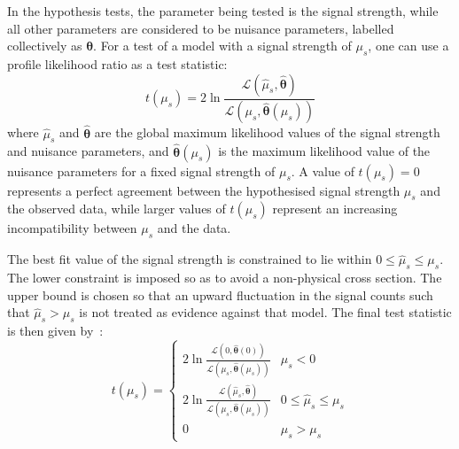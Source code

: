 In the hypothesis tests, the parameter being tested is the signal strength, 
while all other parameters are considered to be nuisance parameters, labelled 
collectively as $\bm{\theta}$.
For a test of a model with a signal strength of $\mu_s$, one can use a profile 
likelihood ratio as a test statistic:
\begin{equation}
t(\mu_s) = 2 \ln \frac{\mathcal{L}(\hat{\mu}_s, 
\hat{\bm{\theta}})}{\mathcal{L}(\mu_s, \hat{\bm{\theta}}(\mu_s))}
\end{equation}
where $\hat{\mu}_s$ and $\hat{\bm{\theta}}$ are the global maximum likelihood 
values of the signal strength 
and nuisance parameters, and $\hat{\bm{\theta}}(\mu_s)$ is the maximum 
likelihood value of the nuisance 
parameters for a fixed signal strength of $\mu_s$. 
A value of $t(\mu_s)=0$ represents a perfect agreement between the hypothesised 
signal strength $\mu_s$ and the observed data, while larger values of 
$t(\mu_s)$ represent an increasing incompatibility between $\mu_s$ and the data.

The best fit value of the signal strength is constrained to lie within $0 \le 
\hat{\mu}_s \le \mu_s$. The lower constraint is imposed so as to avoid a  
non-physical cross section. The upper bound is chosen so that an upward 
fluctuation in the signal counts such that $\hat{\mu}_s > \mu_s$ is not treated 
as evidence against that model. 
The final test statistic is then given by~\cite{higgscombine}:
\begin{equation}
t(\mu_s) = 
	\begin{cases}
	2 \ln \frac{\mathcal{L}(0, \hat{\bm{\theta}}(0))}{\mathcal{L}(\mu_s, 
	\hat{\bm{\theta}}(\mu_s))} & \hat{\mu}_s < 0 \\
	2 \ln \frac{\mathcal{L}(\hat{\mu}_s, \hat{\bm{\theta}})}{\mathcal{L}(\mu_s, 
	\hat{\bm{\theta}}(\mu_s))} & 0 \le \hat{\mu}_s \le \mu_s \\
	0 & \hat{\mu}_s > \mu_s
	\end{cases}
\end{equation}

